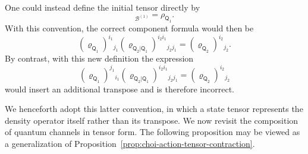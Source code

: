 \documentclass[
    aps,
    pra,
    reprint,
    superscriptaddress,
    nofootinbib
]{revtex4-2}
\theoremstyle{definition}
\theoremstyle{plain}
\begin{document}
One could instead define the initial tensor directly by
\begin{equation}
    [\varrho_{\mathsf{Q}_{1}}]_{\mathcal{B}^{(1)}}
    =
    \rho_{\mathsf{Q}_{1}}.
\end{equation}
With this convention, the correct component formula would then be
\begin{equation}
    \left(\varrho_{\mathsf{Q}_{1}}\right)^{i_{1}}{}_{j_{1}}
    \left(\varrho_{\mathsf{Q}_{2}|\mathsf{Q}_{1}}\right)
    ^{i_{2}i_{1}}{}_{j_{2}j_{1}}
    =
    \left(\varrho_{\mathsf{Q}_{2}}\right)^{i_{2}}{}_{j_{2}}.
    \label{eq:state-action-direct}
\end{equation}
By contrast, with this new definition the expression
\begin{equation}
    \left(\varrho_{\mathsf{Q}_{1}}\right)^{j_{1}}{}_{i_{1}}
    \left(\varrho_{\mathsf{Q}_{2}|\mathsf{Q}_{1}}\right)
    ^{i_{2}i_{1}}{}_{j_{2}j_{1}}
    =
    \left(\varrho_{\mathsf{Q}_{2}}\right)^{i_{2}}{}_{j_{2}}
\end{equation}
would insert an additional transpose and is therefore incorrect.

We henceforth adopt this latter convention, in which a state tensor
represents the density operator itself rather than its transpose. We now
revisit the composition of quantum channels in tensor form. The following
proposition may be viewed as a generalization of
Proposition~\ref{prop:choi-action-tensor-contraction}.
\end{document}
